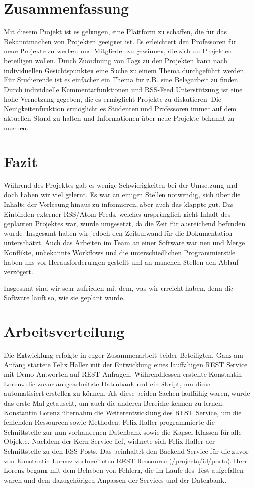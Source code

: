 \documentclass[12pt]{scrartcl}
\begin{document}
	\section{Zusammenfassung}
		Mit diesem Projekt ist es gelungen, eine Plattform zu schaffen, die für das Bekanntmachen von Projekten geeignet ist. Es erleichtert den Professoren für neue Projekte zu werben und Mitglieder zu gewinnen, die sich an Projekten beteiligen wollen. Durch Zuordnung von Tags zu den Projekten kann nach individuellen Gesichtspunkten eine Suche zu einem Thema durchgeführt werden. Für Studierende ist es einfacher ein Thema für z.B. eine Belegarbeit zu finden. Durch individuelle Kommentarfunktionen und RSS-Feed Unterstützung ist eine hohe Vernetzung gegeben, die es ermöglicht Projekte zu diskutieren. Die Neuigkeitenfunktion ermöglicht es Studenten und Professoren immer auf dem aktuellen Stand zu halten und Informationen über neue Projekte bekannt zu machen.
		
	\section{Fazit}
		Während des Projektes gab es wenige Schwierigkeiten bei der Umsetzung und doch haben wir viel gelernt. Es war an einigen Stellen notwendig, sich über die Inhalte der Vorlesung hinaus zu informieren, aber auch das klappte gut.  Das Einbinden externer RSS/Atom Feeds, welches ursprünglich nicht Inhalt des geplanten Projektes war, wurde umgesetzt, da die Zeit für ausreichend befunden wurde. Insgesamt haben wir jedoch den Zeitaufwand für die Dokumentation unterschätzt. Auch das Arbeiten im Team an einer Software war neu und Merge Konflikte, unbekannte Workflows und die unterschiedlichen Programmierstile haben uns vor Herausforderungen gestellt und an manchen Stellen den Ablauf verzögert.
		
		Insgesamt sind wir sehr zufrieden mit dem, was wir erreicht haben, denn die Software läuft so, wie sie geplant wurde.
		
	\section{Arbeitsverteilung}
		
		Die Entwicklung erfolgte in enger Zusammenarbeit beider Beteiligten. Ganz am Anfang startete Felix Haller mit der Entwicklung eines lauffähigen REST Service mit Demo-Antworten auf REST-Anfragen. Währenddessen erstellte Konstantin Lorenz die zuvor ausgearbeitete Datenbank und ein Skript, um diese automatisiert erstellen zu können. Als diese beiden Sachen lauffähig waren, wurde das erste Mal getauscht, um auch die anderen Bereiche kennen zu lernen. Konstantin Lorenz übernahm die Weiterentwicklung des REST Service, um die fehlenden Ressourcen sowie Methoden. Felix Haller programmierte die Schnittstelle zur nun vorhandenen Datenbank sowie die Kapsel-Klassen für alle Objekte.
		Nachdem der Kern-Service lief, widmete sich Felix Haller der Schnittstelle zu den RSS Posts. Das beinhaltet den Backend-Service für die zuvor von Konstantin Lorenz vorbereiteten REST Ressource (/projects/{id}/posts). Herr Lorenz begann mit dem Beheben von Fehlern, die im Laufe des Test aufgefallen waren und dem dazugehörigen Anpassen der Services und der Datenbank.
		
\end{document}
